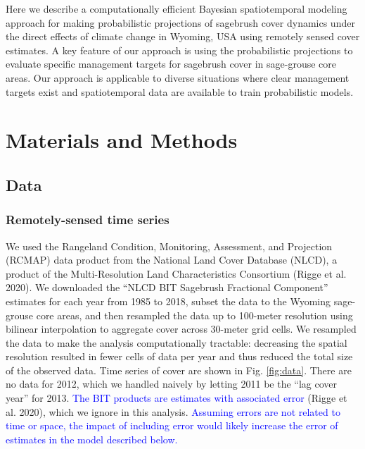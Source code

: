 \documentclass[
  12pt,
]{article}
\begin{document}
Here we describe a computationally efficient Bayesian spatiotemporal modeling approach for making probabilistic projections of sagebrush cover dynamics under the direct effects of climate change in Wyoming, USA using remotely sensed cover estimates.
A key feature of our approach is using the probabilistic projections to evaluate specific management targets for sagebrush cover in sage-grouse core areas.
Our approach is applicable to diverse situations where clear management targets exist and spatiotemporal data are available to train probabilistic models.

\hypertarget{materials-and-methods}{%
\section{Materials and Methods}\label{materials-and-methods}}

\hypertarget{data}{%
\subsection{Data}\label{data}}

\hypertarget{remotely-sensed-time-series}{%
\subsubsection{Remotely-sensed time series}\label{remotely-sensed-time-series}}

We used the Rangeland Condition, Monitoring, Assessment, and Projection (RCMAP) data product from the National Land Cover Database (NLCD), a product of the Multi-Resolution Land Characteristics Consortium (Rigge et al. 2020).
We downloaded the ``NLCD BIT Sagebrush Fractional Component'' estimates for each year from 1985 to 2018, subset the data to the Wyoming sage-grouse core areas, and then resampled the data up to 100-meter resolution using bilinear interpolation to aggregate cover across 30-meter grid cells.
We resampled the data to make the analysis computationally tractable: decreasing the spatial resolution resulted in fewer cells of data per year and thus reduced the total size of the observed data.
Time series of cover are shown in Fig. \ref{fig:data}.
There are no data for 2012, which we handled naively by letting 2011 be the ``lag cover year'' for 2013.
\textcolor{blue}{The BIT products are estimates with associated error} (Rigge et al. 2020), which we ignore in this analysis.
\textcolor{blue}{Assuming errors are not related to time or space, the impact of including error would likely increase the error of estimates in the model described below.}
\end{document}
